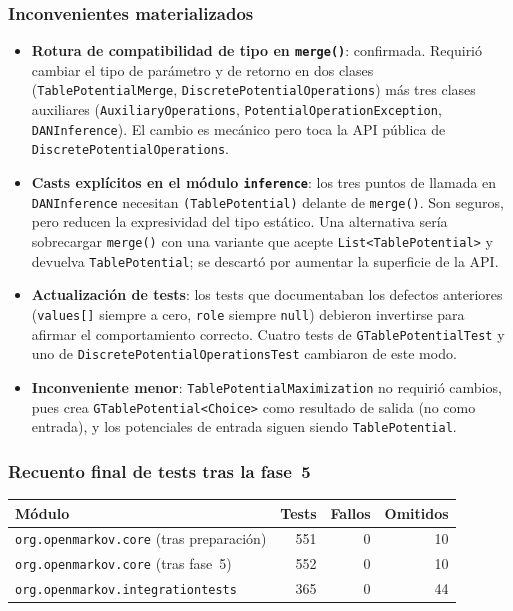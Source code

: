 \documentclass[11pt,a4paper]{article}
\newcommand{\code}[1]{\texttt{#1}}
\begin{document}
\subsubsection*{Inconvenientes materializados}

\begin{itemize}
  \item \textbf{Rotura de compatibilidad de tipo en \code{merge()}}: confirmada.
        Requirió cambiar el tipo de parámetro y de retorno en dos clases
        (\code{Table\-Potential\-Merge}, \code{Discrete\-Potential\-Operations}) más
        tres clases auxiliares (\code{Auxiliary\-Operations},
        \code{Potential\-Operation\-Exception}, \code{DAN\-Inference}).  El cambio es
        mecánico pero toca la API pública de
        \code{Discrete\-Potential\-Operations}.
  \item \textbf{Casts explícitos en el módulo \code{inference}}: los tres puntos
        de llamada en \code{DANInference} necesitan \code{(TablePotential)} delante
        de \code{merge()}.  Son seguros, pero reducen la expresividad del tipo
        estático.  Una alternativa sería sobrecargar \code{merge()} con una
        variante que acepte \code{List<TablePotential>} y devuelva
        \code{TablePotential}; se descartó por aumentar la superficie de la API.
  \item \textbf{Actualización de tests}: los tests que documentaban los defectos
        anteriores (\code{values[]} siempre a cero, \code{role} siempre \code{null})
        debieron invertirse para afirmar el comportamiento correcto.  Cuatro tests
        de \code{GTablePotentialTest} y uno de \code{DiscretePotentialOperationsTest}
        cambiaron de este modo.
  \item \textbf{Inconveniente menor}: \code{TablePotentialMaximization} no
        requirió cambios, pues crea \code{GTablePotential<Choice>} como resultado
        de salida (no como entrada), y los potenciales de entrada siguen siendo
        \code{TablePotential}.
\end{itemize}

\subsubsection*{Recuento final de tests tras la fase~5}

\begin{center}
\begin{tabular}{lrrr}
\toprule
\textbf{Módulo} & \textbf{Tests} & \textbf{Fallos} & \textbf{Omitidos} \\
\midrule
\code{org.openmarkov.core} (tras preparación) & 551 & 0 & 10 \\
\code{org.openmarkov.core} (tras fase~5)         & 552 & 0 & 10 \\
\midrule
\code{org.openmarkov.integrationtests}           & 365 & 0 & 44 \\
\bottomrule
\end{tabular}
\end{center}
\end{document}

